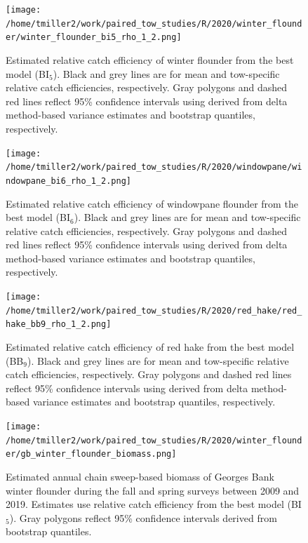 \documentclass[12pt,letterpaper, leqno]{article}
\begin{document}
\begin{landscape}

\begin{figure}
\caption{Estimated relative catch efficiency of winter flounder from the best model (BI$_5$). Black and grey lines are for mean and tow-specific relative catch efficiencies, respectively. Gray polygons and dashed red lines reflect 95\% confidence intervals using derived from delta method-based variance estimates and bootstrap quantiles, respectively.}\label{combined_rhos_winter}
\begin{center}
\texttt{[image: /home/tmiller2/work/paired\_tow\_studies/R/2020/winter\_flounder/winter\_flounder\_bi5\_rho\_1\_2.png]}
\end{center}
\end{figure}

\begin{figure}
\caption{Estimated relative catch efficiency of windowpane flounder from the best model (BI$_6$). Black and grey lines are for mean and tow-specific relative catch efficiencies, respectively. Gray polygons and dashed red lines reflect 95\% confidence intervals using derived from delta method-based variance estimates and bootstrap quantiles, respectively.}\label{combined_rhos_windowpane}
\begin{center}
\texttt{[image: /home/tmiller2/work/paired\_tow\_studies/R/2020/windowpane/windowpane\_bi6\_rho\_1\_2.png]}
\end{center}
\end{figure}

\begin{figure}
\caption{Estimated relative catch efficiency of red hake from the best model (BB$_9$). Black and grey lines are for mean and tow-specific relative catch efficiencies, respectively. Gray polygons and dashed red lines reflect 95\% confidence intervals using derived from delta method-based variance estimates and bootstrap quantiles, respectively.}\label{combined_rhos_redhake}
\begin{center}
\texttt{[image: /home/tmiller2/work/paired\_tow\_studies/R/2020/red\_hake/red\_hake\_bb9\_rho\_1\_2.png]}
\end{center}
\end{figure}
\end{landscape}

\begin{figure}
\caption{Estimated annual chain sweep-based biomass of Georges Bank winter flounder during the fall and spring surveys between 2009 and 2019. Estimates use relative catch efficiency from the best model (BI$_5$). Gray polygons reflect 95\% confidence intervals derived from bootstrap quantiles.}\label{gb_winter_flounder_biomass}
\begin{center}
\texttt{[image: /home/tmiller2/work/paired\_tow\_studies/R/2020/winter\_flounder/gb\_winter\_flounder\_biomass.png]}
\end{center}
\end{figure}
\end{document}
